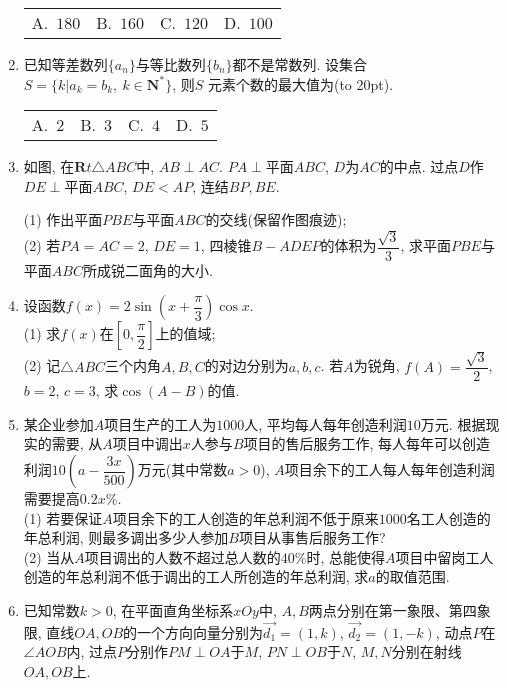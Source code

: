 \documentclass[10pt,a4paper]{article}
\newcommand{\bracket}[1]{(\hbox to #1pt{})}
\newcommand{\fourch}[4]{\par\begin{tabular}{p{.23\textwidth}p{.23\textwidth}p{.23\textwidth}p{.23\textwidth}}
A.~#1 &B.~#2& C.~#3& D.~#4
\end{tabular}}
\begin{document}
\begin{enumerate}[1.]
\fourch{$180$}{$160$}{$120$}{$100$}
\item 已知等差数列$\{a_n\}$与等比数列$\{b_n\}$都不是常数列. 设集合$S=\{k|a_k=b_k, \ k\in \mathbf{N}^*\}$, 则$S$	元素个数的最大值为\bracket{20}.
\fourch{$2$}{$3$}{$4$}{$5$}
\item 如图, 在$\mathbf{R}t\triangle ABC$中, $AB\perp AC$. $PA\perp$平面$ABC$, $D$为$AC$的中点. 过点$D$作$DE\perp$平面$ABC$, $DE<AP$, 连结$BP,BE$.
\begin{center}
\end{center}
(1) 作出平面$PBE$与平面$ABC$的交线(保留作图痕迹);\\
(2) 若$PA=AC=2$, $DE=1$, 四棱锥$B-ADEP$的体积为$\dfrac{\sqrt 3}3$, 求平面$PBE$与平面$ABC$所成锐二面角的大小.
\item 设函数$f(x)=2\sin (x+\dfrac{\pi }3)\cos x$.\\
(1) 求$f(x)$在$[0,\dfrac{\pi }2]$上的值域;\\
(2) 记$\triangle ABC$三个内角$A,B,C$的对边分别为$a,b,c$. 若$A$为锐角, $f(A)=\dfrac{\sqrt 3}2$, $b=2$, $c=3$, 求$\cos (A-B)$的值.
\item 某企业参加$A$项目生产的工人为$1000$人, 平均每人每年创造利润$10$万元. 根据现实的需要, 从$A$项目中调出$x$人参与$B$项目的售后服务工作, 每人每年可以创造利润$10(a-\dfrac{3x}{500})$万元(其中常数$a>0$), $A$项目余下的工人每人每年创造利润需要提高$0.2x\%$.\\
(1) 若要保证$A$项目余下的工人创造的年总利润不低于原来$1000$名工人创造的年总利润, 则最多调出多少人参加$B$项目从事售后服务工作?\\
(2) 当从$A$项目调出的人数不超过总人数的$40\%$时, 总能使得$A$项目中留岗工人创造的年总利润不低于调出的工人所创造的年总利润, 求$a$的取值范围.
\item 已知常数$k>0$, 在平面直角坐标系$xOy$中, $A,B$两点分别在第一象限、第四象限, 直线$OA,OB$的一个方向向量分别为$\overrightarrow{d_1}=(1,k)$, $\overrightarrow{d_2}=(1,-k)$, 动点$P$在$\angle AOB$内, 过点$P$分别作$PM\perp OA$于$M$, $PN\perp OB$于$N$, $M,N$分别在射线$OA,OB$上.\\

\end{enumerate}
\end{document}
